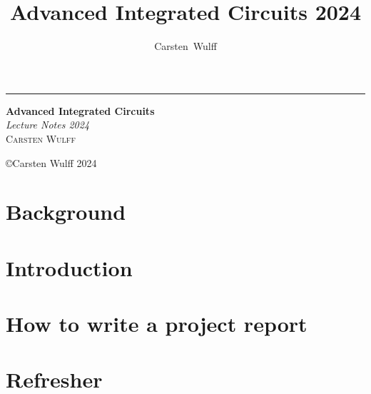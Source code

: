 \documentclass[11pt,twoside,openright]{book}
\title{Advanced Integrated Circuits 2024}
\author{Carsten~Wulff}
\date{}
\begin{document}
\begin{titlepage} %

	\raggedleft %

	\rule{1pt}{\textheight} %
	\hspace{0.05\textwidth} %
	\parbox[b]{0.75\textwidth}{ %

		{\Huge\bfseries Advanced Integrated Circuits}\\[2\baselineskip] %
		{\large\textit{Lecture Notes 2024}}\\[4\baselineskip] %
		{\Large\textsc{Carsten Wulff}} %

		\vspace{0.5\textheight} %

    

		{\noindent \copyright Carsten Wulff 2024}\\[\baselineskip] %
	}

\end{titlepage}



{
\hypersetup{linkcolor=}
\setcounter{tocdepth}{2}
\tableofcontents
}



\mainmatter

\chapter{Background}


\chapter{Introduction}


\chapter{How to write a project report}


\chapter{Refresher}

\end{document}
